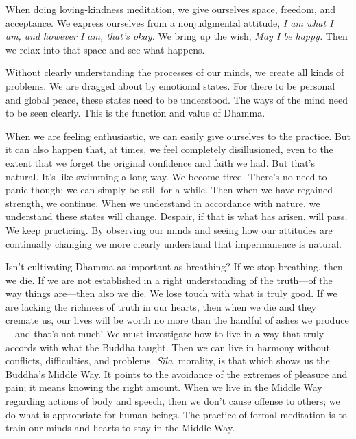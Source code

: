 When doing loving-kindness meditation, we give ourselves space, 
freedom, and acceptance. We express ourselves from a nonjudgmental 
attitude, \emph{I am what I am, and however I am, that's okay.} We 
bring up the wish, \emph{May I be happy.} Then we relax into that space 
and see what happens.


Without clearly understanding the processes of our minds, we create all 
kinds of problems. We are dragged about by emotional states. For there 
to be personal and global peace, these states need to be understood. 
The ways of the mind need to be seen clearly. This is the function and 
value of Dhamma.

When we are feeling enthusiastic, we can easily give ourselves to the 
practice. But it can also happen that, at times, we feel completely 
disillusioned, even to the extent that we forget the original 
confidence and faith we had. But that's natural. It's like swimming a 
long way. We become tired. There's no need to panic though; we can 
simply be still for a while. Then when we have regained strength, we 
continue. When we understand in accordance with nature, we understand 
these states will change. Despair, if that is what has arisen, will 
pass. We keep practicing. By observing our minds and seeing how our 
attitudes are continually changing we more clearly understand that 
impermanence is natural.

Isn't cultivating Dhamma as important as breathing? If we stop 
breathing, then we die. If we are not established in a right 
understanding of the truth---of the way things are---then also we die. 
We lose touch with what is truly good. If we are lacking the richness 
of truth in our hearts, then when we die and they cremate us, our lives 
will be worth no more than the handful of ashes we produce---and that's 
not much! We must investigate how to live in a way that truly accords 
with what the Buddha taught. Then we can live in harmony without 
conflicts, difficulties, and problems. \emph{Sīla}, morality, is that 
which shows us the Buddha's Middle Way. It points to the avoidance of 
the extremes of pleasure and pain; it means knowing the right amount. 
When we live in the Middle Way regarding actions of body and speech, 
then we don't cause offense to others; we do what is appropriate for 
human beings. The practice of formal meditation is to train our minds 
and hearts to stay in the Middle Way.

